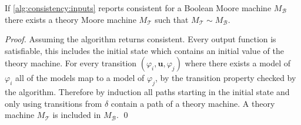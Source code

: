 \documentclass[runningheads]{llncs}
\newcommand{\theory}{\mathcal{T}}
\newcommand{\bool}{\mathcal{B}}
\newcommand{\updf}{\mathbf{u}}
\begin{document}
\begin{lemma}
If \cref{alg:consistency:inputs} reports consistent for a Boolean Moore machine $M_\bool$ there exists a theory Moore machine $M_\theory$ such that $M_\theory \sim M_\bool$.
\label{lem:consistent}
\end{lemma}
\begin{proof}
Assuming the algorithm returns consistent.
Every output function is satisfiable, this includes the initial state which contains an initial value of the theory machine.
For every transition $(\varphi_i, \updf, \varphi_j)$ where there exists a model of $\varphi_i$ all of the models map to a model of $\varphi_j$, by the transition property checked by the algorithm.
Therefore by induction all paths starting in the initial state and only using transitions from $\delta$ contain a path of a theory machine.
A theory machine $M_\theory$ is included in $M_\bool$.
\qed
\end{proof}
\end{document}
